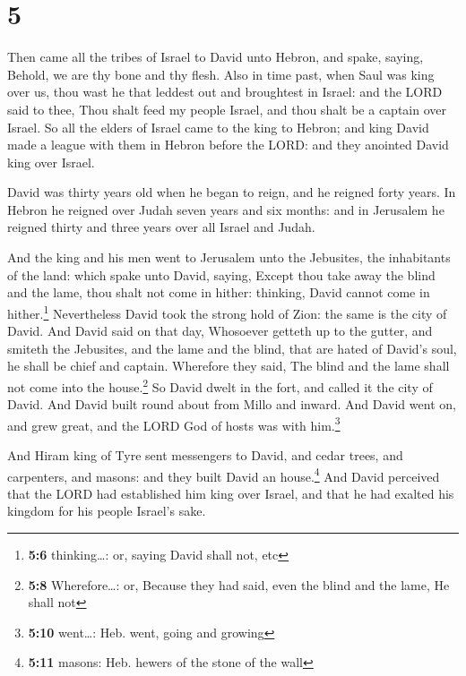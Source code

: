 \hypertarget{section-4}{%
\section{5}\label{section-4}}

 Then came all the tribes of Israel to David unto Hebron,
and spake, saying, Behold, we are thy bone and thy flesh. 
Also in time past, when Saul was king over us, thou wast he that leddest
out and broughtest in Israel: and the LORD said to thee, Thou shalt feed
my people Israel, and thou shalt be a captain over Israel.
 So all the elders of Israel came to the king to Hebron;
and king David made a league with them in Hebron before the LORD: and
they anointed David king over Israel.

 David was thirty years old when he began to reign, and he
reigned forty years.  In Hebron he reigned over Judah
seven years and six months: and in Jerusalem he reigned thirty and three
years over all Israel and Judah.

 And the king and his men went to Jerusalem unto the
Jebusites, the inhabitants of the land: which spake unto David, saying,
Except thou take away the blind and the lame, thou shalt not come in
hither: thinking, David cannot come in hither.\footnote{\textbf{5:6}
  thinking\ldots: or, saying David shall not, etc} 
Nevertheless David took the strong hold of Zion: the same is the city of
David.  And David said on that day, Whosoever getteth up
to the gutter, and smiteth the Jebusites, and the lame and the blind,
that are hated of David's soul, he shall be chief and captain. Wherefore
they said, The blind and the lame shall not come into the
house.\footnote{\textbf{5:8} Wherefore\ldots: or, Because they had said,
  even the blind and the lame, He shall not}  So David
dwelt in the fort, and called it the city of David. And David built
round about from Millo and inward.  And David went on,
and grew great, and the LORD God of hosts was with him.\footnote{\textbf{5:10}
  went\ldots: Heb. went, going and growing}

 And Hiram king of Tyre sent messengers to David, and
cedar trees, and carpenters, and masons: and they built David an
house.\footnote{\textbf{5:11} masons: Heb. hewers of the stone of the
  wall}  And David perceived that the LORD had
established him king over Israel, and that he had exalted his kingdom
for his people Israel's sake.

